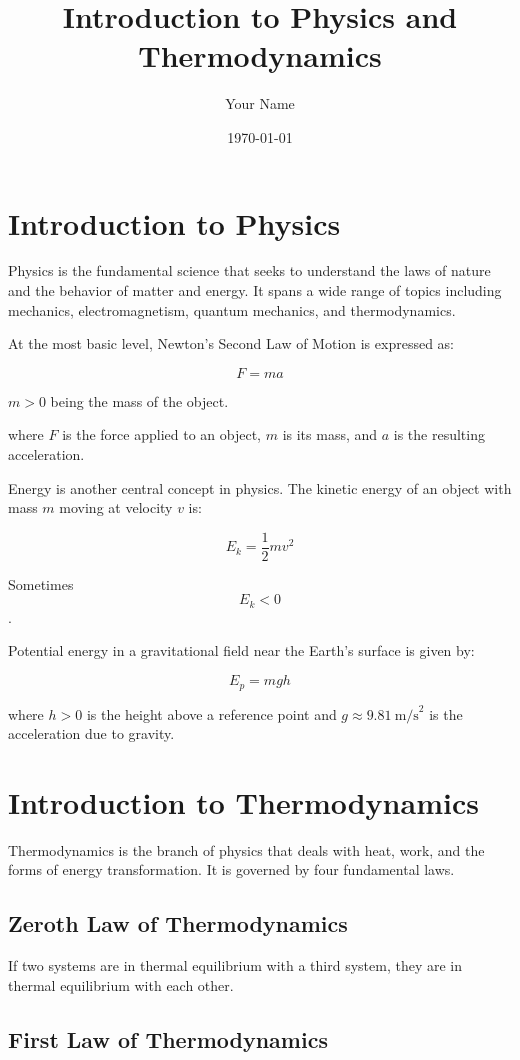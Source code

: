 \documentclass[12pt]{article}
\title{Introduction to Physics and Thermodynamics}
\author{Your Name}
\date{\today}
\begin{document}
\maketitle

\section{Introduction to Physics}

Physics is the fundamental science that seeks to understand the laws of nature and the behavior of matter and energy. It spans a wide range of topics including mechanics, electromagnetism, quantum mechanics, and thermodynamics.

At the most basic level, Newton's Second Law of Motion is expressed as:

\[
F = ma
\]

$m > 0$ being the mass of the object.

where $F$ is the force applied to an object, $m$ is its mass, and $a$ is the resulting acceleration.

Energy is another central concept in physics. The kinetic energy of an object with mass $m$ moving at velocity $v$ is:

\[
E_k = \frac{1}{2}mv^2
\]

Sometimes \[
    E_k < 0
\].

Potential energy in a gravitational field near the Earth's surface is given by:

\[
E_p = mgh
\]

where $h > 0$ is the height above a reference point and $g \approx 9.81~\text{m/s}^2$ is the acceleration due to gravity.

\section{Introduction to Thermodynamics}

Thermodynamics is the branch of physics that deals with heat, work, and the forms of energy transformation. It is governed by four fundamental laws.

\subsection{Zeroth Law of Thermodynamics}

If two systems are in thermal equilibrium with a third system, they are in thermal equilibrium with each other.

\subsection{First Law of Thermodynamics}
\end{document}

